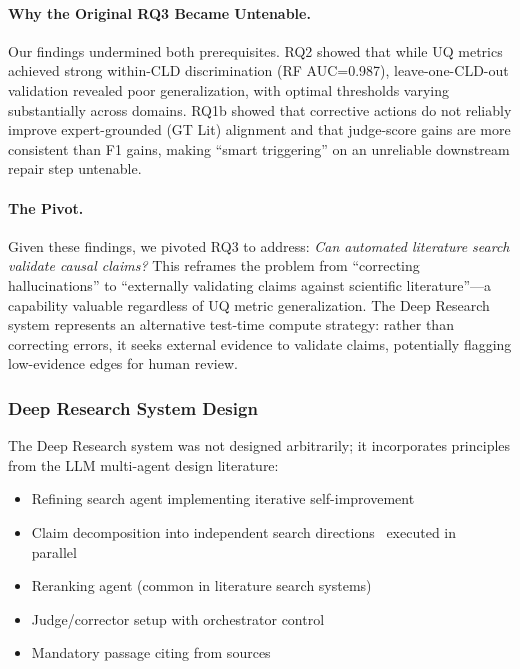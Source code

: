 \paragraph{Why the Original RQ3 Became Untenable.}
Our findings undermined both prerequisites. RQ2 showed that while UQ metrics achieved strong within-CLD discrimination (RF AUC=0.987), leave-one-CLD-out validation revealed poor generalization, with optimal thresholds varying substantially across domains. RQ1b showed that corrective actions do not reliably improve expert-grounded (GT Lit) alignment and that judge-score gains are more consistent than F1 gains, making ``smart triggering'' on an unreliable downstream repair step untenable.

\paragraph{The Pivot.}
Given these findings, we pivoted RQ3 to address: \textit{Can automated literature search validate causal claims?} This reframes the problem from ``correcting hallucinations'' to ``externally validating claims against scientific literature''---a capability valuable regardless of UQ metric generalization. The Deep Research system represents an alternative test-time compute strategy: rather than correcting errors, it seeks external evidence to validate claims, potentially flagging low-evidence edges for human review.

\subsubsection{Deep Research System Design}

The Deep Research system was not designed arbitrarily; it incorporates principles from the LLM multi-agent design literature:
\begin{itemize}[noitemsep]
    \item Refining search agent implementing iterative self-improvement~\citep{madaan2023selfrefineiterativerefinementselffeedback}
    \item Claim decomposition into independent search directions~\citep{dhuliawala2024chain} executed in parallel~\citep{snell2024scalingllmtesttimecompute}
    \item Reranking agent (common in literature search systems)
    \item Judge/corrector setup with orchestrator control
    \item Mandatory passage citing from sources~\citep{batista2025safeimprovingllmsystems}
\end{itemize}

